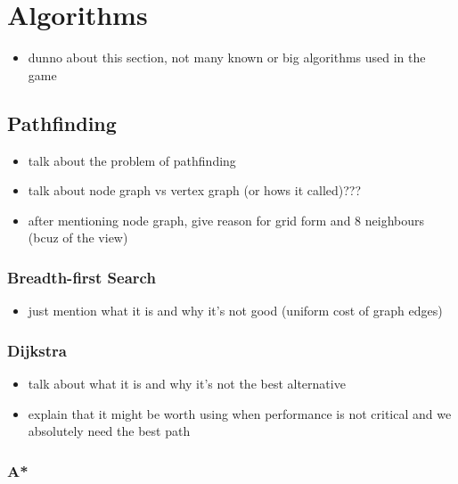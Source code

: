 \section{Algorithms}

\begin{itemize}
    \item dunno about this section, not many known or big
        algorithms used in the game
\end{itemize}


\subsection{Pathfinding}

\begin{itemize}
    \item talk about the problem of pathfinding
    \item talk about node graph vs vertex graph (or hows it called)???
    \item after mentioning node graph, give reason for grid form
	    and 8 neighbours (bcuz of the view)
\end{itemize}

\subsubsection{Breadth-first Search}

\begin{itemize}
    \item just mention what it is and why it's not good
	    (uniform cost of graph edges)
\end{itemize}

\subsubsection{Dijkstra}

\begin{itemize}
    \item talk about what it is and why it's not the best alternative
    \item explain that it might be worth using when performance is
	    not critical and we absolutely need the best path
\end{itemize}

\subsubsection{A*}

